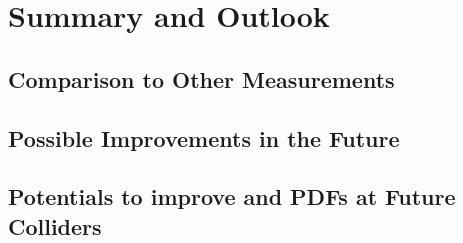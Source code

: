 \chapter*{Summary and Outlook}
\section{Comparison to Other Measurements}
\section{Possible Improvements in the Future}
\section{Potentials to improve \as and PDFs at Future Colliders}